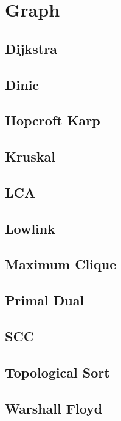 \section{Graph}


\subsection{Dijkstra}


\subsection{Dinic}


\subsection{Hopcroft Karp}



\subsection{Kruskal}


\subsection{LCA}


\subsection{Lowlink}


\subsection{Maximum Clique}


\subsection{Primal Dual}


\subsection{SCC}


\subsection{Topological Sort}


\subsection{Warshall Floyd}

